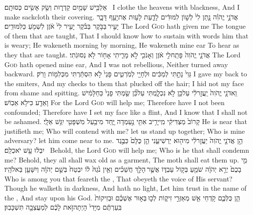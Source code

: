 {אַלְבִּ֥ישׁ שָׁמַ֖יִם קַדְר֑וּת וְשַׂ֖ק אָשִׂ֥ים כְּסוּתָֽם׃ \petucha }
{I clothe the heavens with blackness, And I make sackcloth their covering.}
{אֲדֹנָ֣י יֱהֹוִ֗ה נָ֤תַן לִי֙ לְשׁ֣וֹן לִמּוּדִ֔ים לָדַ֛עַת לָע֥וּת אֶת\maqqaf יָעֵ֖ף דָּבָ֑ר יָעִ֣יר \legarmeh  בַּבֹּ֣קֶר בַּבֹּ֗קֶר יָעִ֥יר לִי֙ אֹ֔זֶן לִשְׁמֹ֖עַ כַּלִּמּוּדִֽים׃}
{The Lord \textsc{God} hath given me The tongue of them that are taught, That I should know how to sustain with words him that is weary; He wakeneth morning by morning, He wakeneth mine ear To hear as they that are taught.}
{אֲדֹנָ֤י יֱהֹוִה֙ פָּתַֽח\maqqaf לִ֣י אֹ֔זֶן וְאָנֹכִ֖י לֹ֣א מָרִ֑יתִי אָח֖וֹר לֹ֥א נְסוּגֹֽתִי׃}
{The Lord \textsc{God} hath opened mine ear, And I was not rebellious, Neither turned away backward.}
{גֵּוִי֙ נָתַ֣תִּי לְמַכִּ֔ים וּלְחָיַ֖י לְמֹֽרְטִ֑ים פָּנַי֙ לֹ֣א הִסְתַּ֔רְתִּי מִכְּלִמּ֖וֹת וָרֹֽק׃}
{I gave my back to the smiters, And my checks to them that plucked off the hair; I hid not my face from shame and spitting.}
{וַֽאדֹנָ֤י יֱהֹוִה֙ יַֽעֲזׇר\maqqaf לִ֔י עַל\maqqaf כֵּ֖ן לֹ֣א נִכְלָ֑מְתִּי עַל\maqqaf כֵּ֞ן שַׂ֤מְתִּי פָנַי֙ כַּחַלָּמִ֔ישׁ וָאֵדַ֖ע כִּי\maqqaf לֹ֥א אֵבֽוֹשׁ׃}
{For the Lord \textsc{God} will help me; Therefore have I not been confounded; Therefore have I set my face like a flint, And I know that I shall not be ashamed.}
{קָרוֹב֙ מַצְדִּיקִ֔י מִֽי\maqqaf יָרִ֥יב אִתִּ֖י נַ֣עַמְדָה יָּ֑חַד מִי\maqqaf בַ֥עַל מִשְׁפָּטִ֖י יִגַּ֥שׁ אֵלָֽי׃}
{He is near that justifieth me; Who will contend with me? let us stand up together; Who is mine adversary? let him come near to me.}
{הֵ֣ן אֲדֹנָ֤י יֱהֹוִה֙ יַעֲזׇר\maqqaf לִ֔י מִי\maqqaf ה֖וּא יַרְשִׁיעֵ֑נִי הֵ֤ן כֻּלָּם֙ כַּבֶּ֣גֶד יִבְל֔וּ עָ֖שׁ יֹאכְלֵֽם׃ \setuma }
{Behold, the Lord \textsc{God} will help me; Who is he that shall condemn me? Behold, they all shall wax old as a garment, The moth shall eat them up.}
{מִ֤י בָכֶם֙ יְרֵ֣א יְהֹוָ֔ה שֹׁמֵ֖עַ בְּק֣וֹל עַבְדּ֑וֹ אֲשֶׁ֣ר \legarmeh  הָלַ֣ךְ חֲשֵׁכִ֗ים וְאֵ֥ין נֹ֙גַהּ֙ ל֔וֹ יִבְטַח֙ בְּשֵׁ֣ם יְהֹוָ֔ה וְיִשָּׁעֵ֖ן בֵּאלֹהָֽיו׃ \setuma }
{Who is among you that feareth the \lord, That obeyeth the voice of His servant? Though he walketh in darkness, And hath no light, Let him trust in the name of the \lord, And stay upon his God.}
{הֵ֧ן כֻּלְּכֶ֛ם קֹ֥דְחֵי אֵ֖שׁ מְאַזְּרֵ֣י זִיק֑וֹת לְכ֣וּ \legarmeh  בְּא֣וּר אֶשְׁכֶ֗ם וּבְזִיקוֹת֙ בִּֽעַרְתֶּ֔ם מִיָּדִי֙ הָיְתָה\maqqaf זֹּ֣את לָכֶ֔ם לְמַעֲצֵבָ֖ה תִּשְׁכָּבֽוּן׃ \setuma }
